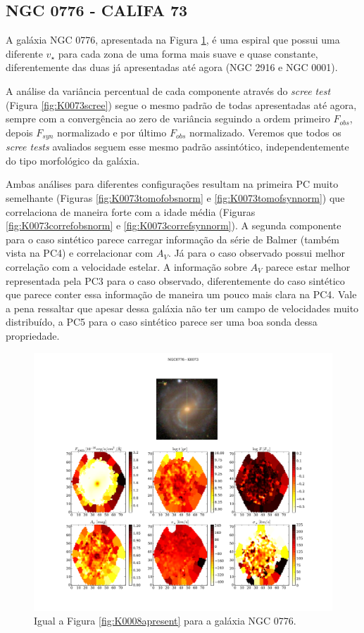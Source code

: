 \subsection{NGC 0776 - CALIFA 73}

A galáxia NGC 0776, apresentada na Figura \ref{fig:K0073apresent}, é uma espiral que possui uma diferente $v_\star$ para
cada zona de uma forma mais suave e quase constante, diferentemente das duas já apresentadas até agora (NGC 2916 e NGC
0001).

A análise da variância percentual de cada componente através do {\em scree test} (Figura \ref{fig:K0073scree}) segue o
mesmo padrão de todas apresentadas até agora, sempre com a convergência ao zero de variância seguindo a ordem primeiro
$F_{obs}$, depois $F_{syn}$ normalizado e por último $F_{obs}$ normalizado. Veremos que todos os {\em scree
tests} avaliados seguem esse mesmo padrão assintótico, independentemente do tipo morfológico da galáxia.

Ambas análises para diferentes configurações resultam na primeira PC muito semelhante (Figuras
\ref{fig:K0073tomofobsnorm} e \ref{fig:K0073tomofsynnorm}) que correlaciona de maneira forte com a idade média (Figuras
\ref{fig:K0073correfobsnorm} e \ref{fig:K0073correfsynnorm}). A segunda componente para o caso sintético parece
carregar informação da série de Balmer (também vista na PC4) e correlacionar com $A_V$. Já para o caso observado possui
melhor correlação com a velocidade estelar. A informação sobre $A_V$ parece estar melhor representada pela PC3 para o
caso observado, diferentemente do caso sintético que parece conter essa informação de maneira um pouco mais clara na
PC4. Vale a pena ressaltar que apesar dessa galáxia não ter um campo de velocidades muito distribuído, a PC5 para o caso
sintético parece ser uma boa sonda dessa propriedade.

\begin{figure}
    \includegraphics[width=1.\textwidth]{figuras/K0073-apresent.pdf}
    \caption[Propriedades f\'isicas da gal\'axia NGC 0776.]
    {Igual a Figura \ref{fig:K0008apresent} para a galáxia NGC 0776.}
    \label{fig:K0073apresent}
\end{figure}

